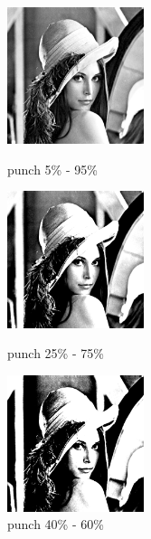 \documentclass[a4paper,UTF8]{article}
\numberwithin{equation}{section}
\begin{document}
\begin{enumerate}[(\romannumeral1)]
\begin{figure}[htbp]
\centering
\begin{minipage}[t]{0.30\textwidth}
\centering
\includegraphics[width=4cm]{Lenna_punch_5_5.png}
\caption{ punch 5\% - 95\%}
\label{Lenna:5_punch}
\end{minipage}
\centering
\begin{minipage}[t]{0.30\textwidth}
\centering
\includegraphics[width=4cm]{Lenna_punch_25_25.png}
\caption{ punch 25\% - 75\%}
\label{Lenna:25_punch}
\end{minipage}\centering 
\begin{minipage}[t]{0.30\textwidth}
\centering
\includegraphics[width=4cm]{Lenna_punch_40_40.png}
\caption{ punch 40\% - 60\%}
\label{Lenna:40_punch}
\end{minipage}
\end{figure}


\end{enumerate}
\end{document}
